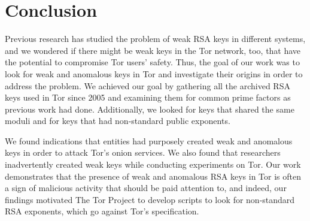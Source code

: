 \section{Conclusion}
\label{sec:conclusion}

Previous research has studied the problem of weak RSA keys in different
systems, and we wondered if there might be weak keys in the Tor
network, too, that have the potential to compromise Tor users' safety.
Thus, the goal of our work was to look for weak and anomalous keys in Tor
and investigate their origins in order to address the problem.  We
achieved our goal by gathering all the archived RSA keys used in Tor since
2005 and examining them for common prime factors as previous work had done.
Additionally, we looked for keys that shared the same moduli and
for keys that had non-standard public exponents.

We found indications that entities had purposely created weak and anomalous keys
in order to attack Tor's onion services.  We also found that researchers
inadvertently created weak keys while conducting experiments on Tor.
Our work demonstrates that the presence of weak and anomalous RSA keys in Tor is
often a sign of malicious activity that should be paid attention to, and 
indeed, our findings motivated The Tor Project to develop scripts to look for
non-standard RSA exponents, which go against Tor's specification.
